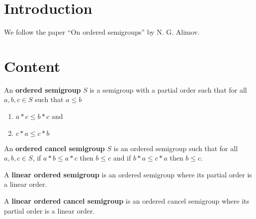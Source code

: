 %

\section{Introduction}
We follow the paper ``On ordered semigroups'' by
N. G. Alimov.

\section{Content}

\begin{definition}\label{def:OrderedSemigroup}\leanok
An \textbf{ordered semigroup} $S$ is a semigroup with a partial order such that
for all $a,b,c\in S$ such that $a \le b$
\begin{enumerate}
    \item $a * c \le b * c$ and
    \item $c * a \le c * b$
\end{enumerate}
\end{definition}

\begin{definition}\label{def:OrderedCancelSemigroup}\leanok
{}
An \textbf{ordered cancel semigroup} $S$ is an ordered semigroup such that for all $a,b,c\in S$,
if $a * b \le a * c$ then $b \le c$ and if $b * a \le c * a$ then $b \le c$.
\end{definition}

\begin{definition}\label{def:LinearOrderedSemigroup}\leanok
{}
A \textbf{linear ordered semigroup} is an ordered semigroup where its partial order is a linear order.
\end{definition}

\begin{definition}\label{def:LinearOrderedCancelSemigroup}\leanok
{}
A \textbf{linear ordered cancel semigroup} is an ordered cancel semigroup where its partial order is a linear order.
\end{definition}

